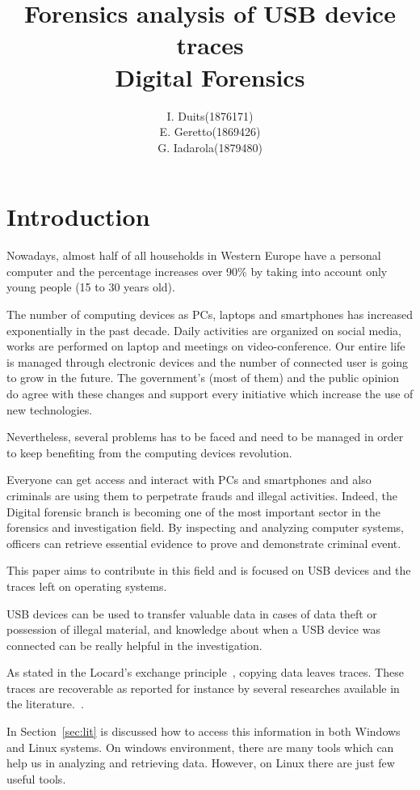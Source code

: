 \documentclass[a4paper]{article}
\title{Forensics analysis of USB device traces\\
\large Digital Forensics}
\author{
\begin{tabular}{>{\raggedleft}m{5cm}m{5cm}}
I. Duits & (1876171) \\
E. Geretto & (1869426) \\
G. Iadarola & (1879480) \\
\end{tabular}
}
\begin{document}
\maketitle

\section{Introduction}
Nowadays, almost half of all households in Western Europe have a personal
computer and the percentage increases over 90\% by taking into account only
young people (15 to 30 years old).

The number of computing devices as PCs, laptops and smartphones has increased
exponentially in the past decade. Daily activities are organized on social
media, works are performed on laptop and meetings on video-conference. Our
entire life is managed through electronic devices and the number of connected
user is going to grow in the future. The government's (most of them) and the
public opinion do agree with these changes and support every initiative which
increase the use of new technologies.

Nevertheless, several problems has to be faced and need to be managed in order
to keep benefiting from the computing devices revolution.

Everyone can get access and interact with PCs and smartphones and also criminals
are using them to perpetrate frauds and illegal activities. Indeed, the Digital
forensic branch is becoming one of the most important sector in the forensics
and investigation field. By inspecting and analyzing computer systems, officers
can retrieve essential evidence to prove and demonstrate criminal event.

This paper aims to contribute in this field and is focused on USB devices and
the traces left on operating systems.

USB devices can be used to transfer valuable data in cases of data theft or
possession of illegal material, and knowledge about when a USB device was
connected can be really helpful in the investigation.

As stated in the Locard's exchange principle~\cite{locard2008locard}, copying
data leaves traces. These traces are recoverable as reported for instance by
several researches available in the literature.~\cite{Tanushree12,Abhijeet14}.

In Section~\ref{sec:lit} is discussed how to access this information in both
Windows and Linux systems. On windows environment, there are many tools which
can help us in analyzing and retrieving data. However, on Linux there are just
few useful tools.
\end{document}
